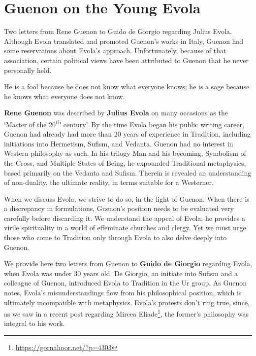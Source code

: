 \section{Guenon on the Young Evola}

Two letters from Rene Guenon to Guido de Giorgio regarding Julius Evola. Although Evola translated and promoted Guenon's works in Italy, Guenon had some reservations about Evola's approach. Unfortunately, because of that association, certain political views have been attributed to Guenon that he never personally held.

\begin{quotex}
He is a fool because he does not know what everyone knows; he is a sage because he knows what everyone does not know.
\end{quotex}


\textbf{Rene Guenon} was described by \textbf{Julius Evola} on many occasions as the `Master of the 20\textsuperscript{th} century'. By the time Evola began his public writing career, Guenon had already had more than 20 years of experience in Tradition, including initiations into Hermetism, Sufism, and Vedanta. Guenon had no interest in Western philosophy as such. In his trilogy Man and his becoming, Symbolism of the Cross, and Multiple States of Being, he expounded Traditional metaphysics, based primarily on the Vedanta and Sufism. Therein is revealed an understanding of non-duality, the ultimate reality, in terms suitable for a Westerner.

When we discuss Evola, we strive to do so, in the light of Guenon. When there is a discrepancy in formulations, Guenon's position needs to be evaluated very carefully before discarding it. We understand the appeal of Evola; he provides a virile spirituality in a world of effeminate churches and clergy. Yet we must urge those who come to Tradition only through Evola to also delve deeply into Guenon.

We provide here two letters from Guenon to \textbf{Guido de Giorgio} regarding Evola, when Evola was under 30 years old. De Giorgio, an initiate into Sufism and a colleague of Guenon, introduced Evola to Tradition in the Ur group. As Guenon notes, Evola's misunderstandings flow from his philosophical position, which is ultimately incompatible with metaphysics. Evola's protests don't ring true, since, as we saw in a recent post regarding Mircea Eliade\footnote{\url{https://gornahoor.net/?p=4303}}, the former's philosophy was integral to his work.

